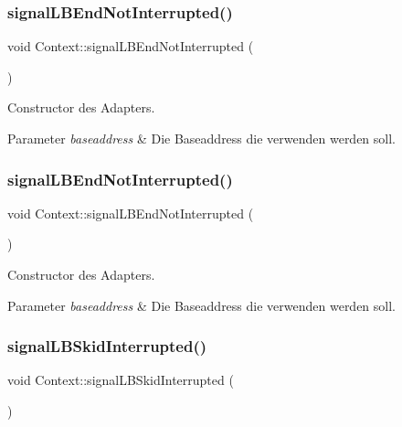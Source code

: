 \subsubsection{\texorpdfstring{signal\+L\+B\+End\+Not\+Interrupted()}{signalLBEndNotInterrupted()}\hspace{0.1cm}{\footnotesize\ttfamily [1/2]}}
{\footnotesize\ttfamily void Context\+::signal\+L\+B\+End\+Not\+Interrupted (\begin{DoxyParamCaption}{ }\end{DoxyParamCaption})}

Constructor des Adapters.


\begin{DoxyParams}{Parameter}
{\em baseaddress} & Die Baseaddress die verwenden werden soll. \\
\hline
\end{DoxyParams}
\hypertarget{class_context_a6debf81836f13909119658b40e32fe1c}{}\label{class_context_a6debf81836f13909119658b40e32fe1c} 
\subsubsection{\texorpdfstring{signal\+L\+B\+End\+Not\+Interrupted()}{signalLBEndNotInterrupted()}\hspace{0.1cm}{\footnotesize\ttfamily [2/2]}}
{\footnotesize\ttfamily void Context\+::signal\+L\+B\+End\+Not\+Interrupted (\begin{DoxyParamCaption}{ }\end{DoxyParamCaption})}

Constructor des Adapters.


\begin{DoxyParams}{Parameter}
{\em baseaddress} & Die Baseaddress die verwenden werden soll. \\
\hline
\end{DoxyParams}
\hypertarget{class_context_a41c95a05dffe3e6d89ebe5a6522e3a6a}{}\label{class_context_a41c95a05dffe3e6d89ebe5a6522e3a6a} 
\subsubsection{\texorpdfstring{signal\+L\+B\+Skid\+Interrupted()}{signalLBSkidInterrupted()}\hspace{0.1cm}{\footnotesize\ttfamily [1/2]}}
{\footnotesize\ttfamily void Context\+::signal\+L\+B\+Skid\+Interrupted (\begin{DoxyParamCaption}{ }\end{DoxyParamCaption})}

